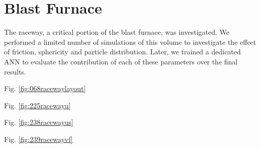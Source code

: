 
\chapter{Blast Furnace}
\label{cap:blastfurnace}

The raceway, a critical portion of the blast furnace, was investigated. We
performed a limited number of simulations of this volume to investigate the
effect of friction, sphericity and particle distribution.
Later, we trained a dedicated \acs{ANN} to evaluate the contribution of each of
these parameters over the final results.

Fig. \ref{fig:068racewaylayout}


Fig. \ref{fig:225racewayu}



Fig. \ref{fig:238racewayus}


Fig. \ref{fig:239racewayvf}
